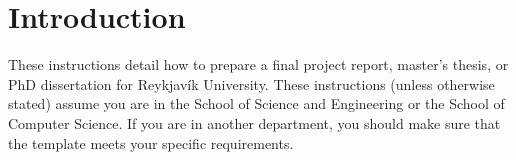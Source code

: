 






\newcommand{\TIheadofgrad}{Benedikt Helgason~\formatemail{benhel AT ru.is} or TVD Person}
\newcommand{\TItvdadmin}{Hjördís Lára Hreinsdóttir~\formatemail{hjordislh AT ru.is}}


\section{Introduction} %
These instructions detail how to prepare a final project report, master's thesis, or PhD dissertation for Reykjavík University.
These instructions (unless otherwise stated) assume you are in the School of Science and Engineering or the School of Computer Science.
If you are in another department, you should make sure that the template meets your specific requirements.

